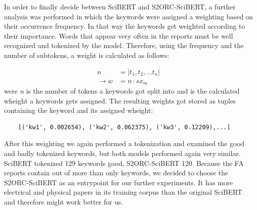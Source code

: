 In order to finally decide between SciBERT and S2ORC-SciBERT, a further analysis was performed in which the keywords were assigned a weighting based on their occurrence frequency. In that way the keywords get weighted according to their importance. Words that appear very often in the reports must be well recognized and tokenized by the model. Therefore, using the frequency and the number of subtokens, a weight is calculated as follows:

\begin{align}
	n &= |t_1, t_2, ... t_n| \\
	\to w &= n \cdot sx_m
\end{align}
were \textit{n} is the number of tokens a keywords got split into and  is the calculated wheight a keywords gets assigned. \newline
The resulting weights got stored as tuples containing the keyword and its assigned wheight:

\begin{code}
	\label{code:wheights}
	\centering
\begin{verbatim}
	[('kw1', 0.002654), ('kw2', 0.062375), ('kw3', 0.12209),...]
\end{verbatim}
\end{code}

After this weighting we again performed a tokenization and examined the good and badly tokenized keywords, but both models performed again very similar. SciBERT tokenized 129 keywords good, S2ORC-SciBERT 120. Because the FA reports contain out of more than only keywords, we decided to choose the S2ORC-SciBERT as an entrypoint for our further experiments. It has more electrical and physical papers in its training corpus than the original SciBERT and therefore might work better for us.